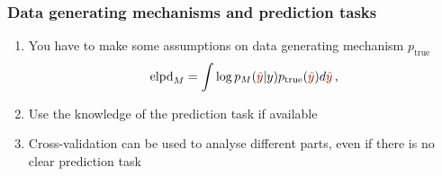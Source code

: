 \documentclass[10pt]{beamer}
\begin{document}
\begin{frame}{}

\frametitle{Data generating mechanisms and prediction tasks}

\begin{enumerate}
\item You have to make some assumptions on data generating mechanism $p_\text{true}$
\[
\text{elpd}_M= \int \log p_M({\color{uured}\tilde{y}}|y) p_\text{true}({\color{uured}\tilde{y}}) d{\color{uured}\tilde{y}}\,,
\]
\item Use the knowledge of the prediction task if available
\item Cross-validation can be used to analyse different parts, even if
  there is no clear prediction task
\end{enumerate}


\end{frame}

\end{document}
